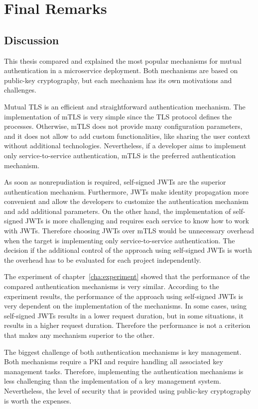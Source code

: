\chapter{Final Remarks}
\label{cha:final_remarks}

\section{Discussion}
This thesis compared and explained the most popular mechanisms for mutual authentication in a microservice deployment.
Both mechanisms are based on public-key cryptography, but each mechanism has its own motivations and challenges.

Mutual TLS is an efficient and straightforward authentication mechanism.
The implementation of mTLS is very simple since the TLS protocol defines the processes.
Otherwise, mTLS does not provide many configuration parameters, and it does not allow to add custom functionalities, like sharing the user context without additional technologies.
Nevertheless, if a developer aims to implement only service-to-service authentication, mTLS is the preferred authentication mechanism.

As soon as nonrepudiation is required, self-signed JWTs are the superior authentication mechanism.
Furthermore, JWTs make identity propagation more convenient and allow the developers to customize the authentication mechanism and add additional parameters.
On the other hand, the implementation of self-signed JWTs is more challenging and requires each service to know how to work with JWTs.
Therefore choosing JWTs over mTLS would be unnecessary overhead when the target is implementing only service-to-service authentication.
The decision if the additional control of the approach using self-signed JWTs is worth the overhead has to be evaluated for each project independently.

The experiment of chapter~\ref{cha:experiment} showed that the performance of the compared authentication mechanisms is very similar.
According to the experiment results, the performance of the approach using self-signed JWTs is very dependent on the implementation of the mechanisms.
In some cases, using self-signed JWTs results in a lower request duration, but in some situations, it results in a higher request duration.
Therefore the performance is not a criterion that makes any mechanism superior to the other.

The biggest challenge of both authentication mechanisms is key management.
Both mechanisms require a PKI and require handling all associated key management tasks.
Therefore, implementing the authentication mechanisms is less challenging than the implementation of a key management system.
Nevertheless, the level of security that is provided using public-key cryptography is worth the expenses.

